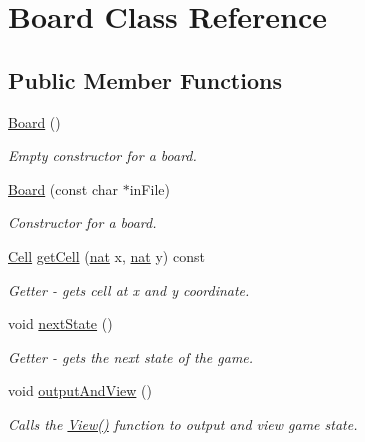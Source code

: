 \hypertarget{class_board}{}\section{Board Class Reference}
\label{class_board}
\subsection*{Public Member Functions}
\begin{DoxyCompactItemize}
\item 
\mbox{\label{class_board_a9ee491d4fea680cf69b033374a9fdfcb}} 
\hyperlink{class_board_a9ee491d4fea680cf69b033374a9fdfcb}{Board} ()
\begin{DoxyCompactList}\small\item\em Empty constructor for a board. \end{DoxyCompactList}\item 
\mbox{\label{class_board_aaeeebed35a341ef519be2b6442e53d9b}} 
\hyperlink{class_board_aaeeebed35a341ef519be2b6442e53d9b}{Board} (const char $\ast$in\+File)
\begin{DoxyCompactList}\small\item\em Constructor for a board. \end{DoxyCompactList}\item 
\hyperlink{class_cell}{Cell} \hyperlink{class_board_af3180b2b2f16752be1cde121b7a68bef}{get\+Cell} (\hyperlink{_cell_types_8h_a56638ee9d162e8cce3a15f92d2023d6e}{nat} x, \hyperlink{_cell_types_8h_a56638ee9d162e8cce3a15f92d2023d6e}{nat} y) const
\begin{DoxyCompactList}\small\item\em Getter -\/ gets cell at x and y coordinate. \end{DoxyCompactList}\item 
\mbox{\label{class_board_ae67c118210572c8f5f3163f39181a880}} 
void \hyperlink{class_board_ae67c118210572c8f5f3163f39181a880}{next\+State} ()
\begin{DoxyCompactList}\small\item\em Getter -\/ gets the next state of the game. \end{DoxyCompactList}\item 
\mbox{\label{class_board_a456879e807d0479d474ee897e34fcd64}} 
void \hyperlink{class_board_a456879e807d0479d474ee897e34fcd64}{output\+And\+View} ()
\begin{DoxyCompactList}\small\item\em Calls the \hyperlink{class_view}{View()} function to output and view game state. \end{DoxyCompactList}\end{DoxyCompactItemize}



